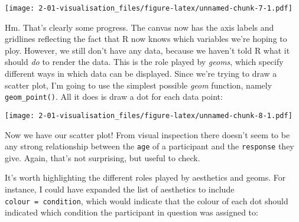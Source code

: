 \documentclass[]{book}
\newenvironment{Shaded}{\begin{snugshade}}{\end{snugshade}}
\newcommand{\DataTypeTok}[1]{\textcolor[rgb]{0.13,0.29,0.53}{#1}}
\newcommand{\KeywordTok}[1]{\textcolor[rgb]{0.13,0.29,0.53}{\textbf{#1}}}
\newcommand{\NormalTok}[1]{#1}
\newcommand{\OperatorTok}[1]{\textcolor[rgb]{0.81,0.36,0.00}{\textbf{#1}}}
\newcommand{\StringTok}[1]{\textcolor[rgb]{0.31,0.60,0.02}{#1}}
\begin{document}
\texttt{[image: 2-01-visualisation\_files/figure-latex/unnamed-chunk-7-1.pdf]}

Hm. That's clearly some progress. The canvas now has the axis labels and gridlines reflecting the fact that R now knows which variables we're hoping to ploy. However, we still don't have any data, because we haven't told R what it should \emph{do} to render the data. This is the role played by \emph{geoms}, which specify different ways in which data can be displayed. Since we're trying to draw a scatter plot, I'm going to use the simplest possible \emph{geom} function, namely \texttt{geom\_point()}. All it does is draw a dot for each data point:

\begin{Shaded}
\end{Shaded}

\texttt{[image: 2-01-visualisation\_files/figure-latex/unnamed-chunk-8-1.pdf]}

Now we have our scatter plot! From visual inspection there doesn't seem to be any strong relationship between the \texttt{age} of a participant and the \texttt{response} they give. Again, that's not surprising, but useful to check.

It's worth highlighting the different roles played by aesthetics and geoms. For instance, I could have expanded the list of aesthetics to include \texttt{colour\ =\ condition}, which would indicate that the colour of each dot should indicated which condition the participant in question was assigned to:

\begin{Shaded}
\end{Shaded}
\end{document}
